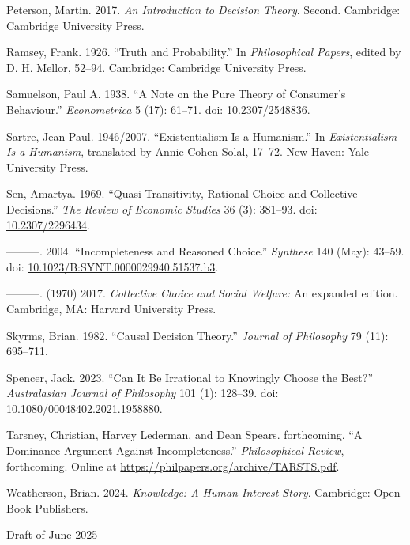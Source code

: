 \documentclass[
  11pt,
  letterpaper,
  DIV=11,
  numbers=noendperiod,
  twoside]{scrartcl}
\newlength{\cslhangindent}
\newenvironment{CSLReferences}[2] %
 {\begin{list}{}{%
  \setlength{\itemindent}{0pt}
  \setlength{\leftmargin}{0pt}
  \setlength{\parsep}{0pt}
  \ifodd #1
   \setlength{\leftmargin}{\cslhangindent}
   \setlength{\itemindent}{-1\cslhangindent}
  \fi
  \setlength{\itemsep}{#2\baselineskip}}}
 {\end{list}}
\begin{document}
\begin{CSLReferences}{1}{0}
Peterson, Martin. 2017. \emph{An Introduction to Decision Theory}.
Second. Cambridge: Cambridge University Press.

Ramsey, Frank. 1926. {``Truth and Probability.''} In \emph{Philosophical
Papers}, edited by D. H. Mellor, 52--94. Cambridge: Cambridge University
Press.

Samuelson, Paul A. 1938. {``A Note on the Pure Theory of Consumer's
Behaviour.''} \emph{Econometrica} 5 (17): 61--71. doi:
\href{https://doi.org/10.2307/2548836}{10.2307/2548836}.

Sartre, Jean-Paul. 1946/2007. {``Existentialism Is a Humanism.''} In
\emph{Existentialism Is a Humanism}, translated by Annie Cohen-Solal,
17--72. New Haven: Yale University Press.

Sen, Amartya. 1969. {``Quasi-Transitivity, Rational Choice and
Collective Decisions.''} \emph{The Review of Economic Studies} 36 (3):
381--93. doi: \href{https://doi.org/10.2307/2296434}{10.2307/2296434}.

---------. 2004. {``Incompleteness and Reasoned Choice.''}
\emph{Synthese} 140 (May): 43--59. doi:
\href{https://doi.org/10.1023/B:SYNT.0000029940.51537.b3}{10.1023/B:SYNT.0000029940.51537.b3}.

---------. (1970) 2017. \emph{Collective Choice and Social Welfare:} An
expanded edition. Cambridge, MA: Harvard University Press.

Skyrms, Brian. 1982. {``Causal Decision Theory.''} \emph{Journal of
Philosophy} 79 (11): 695--711.

Spencer, Jack. 2023. {``Can It Be Irrational to Knowingly Choose the
Best?''} \emph{Australasian Journal of Philosophy} 101 (1): 128--39.
doi:
\href{https://doi.org/10.1080/00048402.2021.1958880}{10.1080/00048402.2021.1958880}.

Tarsney, Christian, Harvey Lederman, and Dean Spears. forthcoming. {``A
Dominance Argument Against Incompleteness.''} \emph{Philosophical
Review}, forthcoming. Online at
\url{https://philpapers.org/archive/TARSTS.pdf}.

Weatherson, Brian. 2024. \emph{Knowledge: A Human Interest Story}.
Cambridge: Open Book Publishers.

\end{CSLReferences}



\noindent Draft of June 2025
\end{document}
